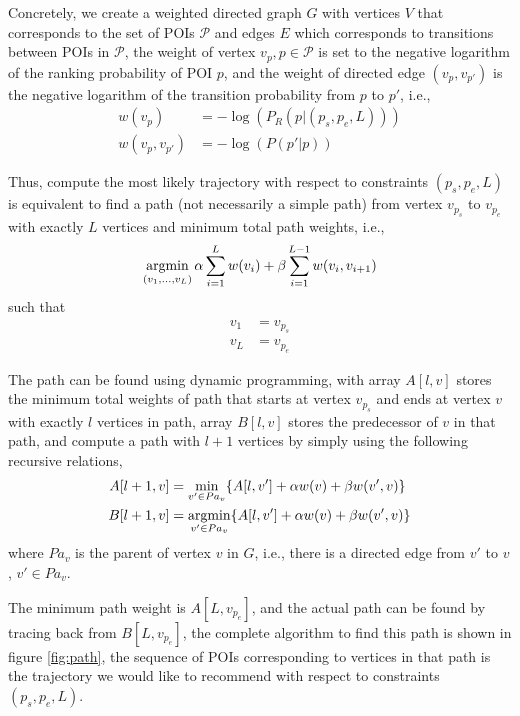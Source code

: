 Concretely,
we create a weighted directed graph $G$ with vertices $V$ that corresponds to the set of POIs $\mathcal{P}$ and 
edges $E$ which corresponds to transitions between POIs in $\mathcal{P}$,
the weight of vertex $v_{p}, p \in \mathcal{P}$ is set to the negative logarithm of the ranking probability of POI $p$, 
and the weight of directed edge $(v_p, v_{p'})$ is the negative logarithm of the transition probability from $p$ to $p'$,
i.e.,
\begin{align*}
    w(v_{p})       & = -\log(P_R(p | (p_s, p_e, L))) \\
    w(v_p, v_{p'}) & = -\log(P(p' | p))
\end{align*}

Thus, compute the most likely trajectory with respect to constraints $(p_s, p_e, L)$ is
equivalent to find a path (not necessarily a simple path) from vertex $v_{p_s}$ to
$v_{p_e}$ with exactly $L$ vertices and minimum total path weights,
i.e.,
\begin{displaymath}
    \operatorname*{argmin}_{(v_1, \dots, v_L)} \alpha \sum_{i=1}^{L} w(v_i) + \beta \sum_{i=1}^{L-1} w(v_i, v_{i+1})
\end{displaymath}
such that
\begin{align*}
    v_1 &= v_{p_s} \\
    v_L &= v_{p_e} 
\end{align*}
    
The path can be found using dynamic programming, 
with array $A[l, v]$ stores the minimum total weights of path 
that starts at vertex $v_{p_s}$ and ends at vertex $v$ with 
exactly $l$ vertices in path,
array $B[l, v]$ stores the predecessor of $v$ in that path,
and compute a path with $l+1$ vertices by simply using the following recursive relations,
\begin{align*}
    A[l+1, v] &= \min_{v' \in Pa_v} \{ A[l, v'] + \alpha w(v) + \beta w(v', v) \} \\
    B[l+1, v] &= \operatorname*{argmin}_{v' \in Pa_v} \{ A[l, v'] + \alpha w(v) + \beta w(v', v) \} 
\end{align*}
where $Pa_v$ is the parent of vertex $v$ in $G$,
i.e., 
there is a directed edge from $v'$ to $v$, $v' \in Pa_v$.

The minimum path weight is $A[L, v_{p_e}]$,
and the actual path can be found by tracing back from $B[L, v_{p_e}]$,
the complete algorithm to find this path is shown in figure \ref{fig:path},
the sequence of POIs corresponding to vertices in that path is the 
trajectory we would like to recommend with respect to constraints $(p_s, p_e, L)$.

